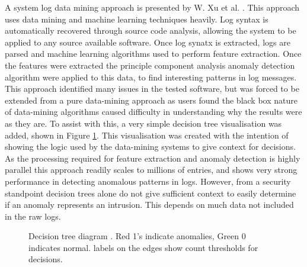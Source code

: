 A system log data mining approach is presented by W. Xu et al. \cite{Xu:2009:DLS:1629575.1629587}. This approach uses data mining and machine learning techniques heavily. Log syntax is automatically recovered through source code analysis, allowing the system to be applied to any source available software. Once log synatx is extracted, logs are parsed and machine learning algorithms used to perform feature extraction. Once the features were extracted the principle component analysis anomaly detection algorithm were applied to this data, to find interesting patterns in log messages. This approach identified many issues in the tested software, but was forced to be extended from a pure data-mining approach as users found the black box nature of data-mining algorithms caused difficulty in understanding why the results were as they are. To assist with this, a very simple decision tree visualisation was added, shown in Figure \ref{decision}. This visualisation was created with the intention of showing the logic used by the data-mining systems to give context for decisions. As the processing required for feature extraction and anomaly detection is highly parallel this approach readily scales to millions of entries, and shows very strong performance in detecting anomalous patterns in logs. However, from a security standpoint decision trees alone do not give sufficient context to easily determine if an anomaly represents an intrusion. This depends on much data not included in the raw logs.

\begin{figure}[tbh]
\caption{\protect\label{decision} Decision tree diagram \cite{Xu:2009:DLS:1629575.1629587}. Red 1's indicate anomalies, Green 0 indicates normal. labels on the edges show count thresholds for decisions.}
\end{figure}


